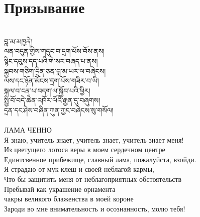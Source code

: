 \section{Призывание}
\\
\ti
བླ་མ་མཁྱནེ།\\
ལན་བདུན་གྱིས་གདུང་བ་དྲག་པོས་བོས་ནས།\\
སྙིང་དབུས་དད་པའི་གེ་སར་བཞད་པ་ནས།\\
སྐྱབས་གཅིག་དྲིན་ཅན་བླ་མ་ཡར་ལ་བཞེངས།\\
ལས་དང་ཉོན་མོངས་དྲག་པོས་གཟིར་བ་ཡི།\\
སྐལ་བ་ངན་པ་བདག་ལ་སྐྱོབ་པའི་ཕྱིར།\\
སྤྱི་བོ་བདེ་ཆེན་འཁོར་ལོའི་རྒྱན་དུ་བཞུགས།\\
དྲན་དང་ཤེས་བཞིན་ཀུན་ཀྱང་བཞེངས་སུ་གསོལ།\\
\\
\ru
ЛАМА ЧЕННО\\
Я знаю, учитель знает, учитель знает, учитель знает меня!\\
Из цветущего лотоса веры в моем сердечном центре \\
Единтсвенное прибежище, славный лама, пожалуйста, взойди.\\
Я страдаю от мук клеш и своей неблагой кармы,\\
Что бы защитить меня от неблагоприятных обстоятельств\\
Пребывай как украшение орнамента \\
чакры великого блаженства в моей короне \\
Зароди во мне внимательность и осознанность, молю тебя!\\

